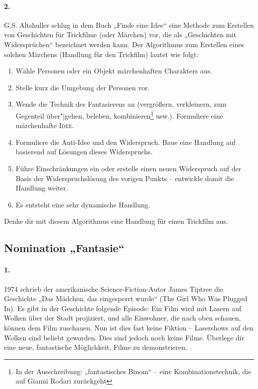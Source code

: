 \documentclass[11pt,a4paper]{article}
\begin{document}
\paragraph{2.}
G.S. Altshuller schlug in dem Buch „Finde eine Idee“ eine Methode zum
Erstellen von Geschichten für Trickfilme (oder Märchen) vor, die als
„Geschichten mit Widersprüchen“ bezeichnet werden kann.  Der Algorithmus zum
Erstellen eines solchen Märchens (Handlung für den Trickfilm) lautet wie
folgt:

\begin{enumerate}
\item Wähle Personen oder ein Objekt märchenhaften Charakters aus.
\item Stelle kurz die Umgebung der Personen vor.
\item Wende die Technik des Fantasierens an (vergrößern, verkleinern, zum
  Gegenteil über"|gehen, beleben, kombinieren\footnote{In der Ausschreibung:
    „fantastisches Binom“ -- eine Kombinationstechnik, die auf Gianni Rodari
    zurückgeht} usw.). Formuliere eine märchenhafte \textsc{Idee}.
\item Formuliere die Anti-Idee und den Widerspruch. Baue eine Handlung auf
  basierend auf Lösungen dieses Widerspruchs.
\item Führe Einschränkungen ein oder erstelle einen neuen Widerspruch auf der
  Basis der Widerspruchslösung des vorigen Punkts -- entwickle damit die
  Handlung weiter.
\item Es entsteht eine sehr dynamische Handlung.
\end{enumerate}
Denke dir mit diesem Algorithmus eine Handlung für einen Trickfilm aus.

\subsection*{Nomination „Fantasie“}

\paragraph{1.}
1974 schrieb der amerikanische Science-Fiction-Autor James Tiptree die
Geschichte „Das Mädchen, das eingesperrt wurde“ (The Girl Who Was Plugged In).
Es gibt in der Geschichte folgende Episode: Ein Film wird mit Lasern auf
Wolken über der Stadt projiziert, und alle Einwohner, die nach oben schauen,
können dem Film zuschauen. Nun ist dies fast keine Fiktion -- Lasershows auf
den Wolken sind beliebt geworden. Dies sind jedoch noch keine Filme.  Überlege
dir eine neue, fantastische Möglichkeit, Filme zu demonstrieren.
\end{document}
